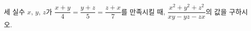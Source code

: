 세 실수 $x$, $y$, $z$가 $\dfrac{x+y}{4}=\dfrac{y+z}{5}=\dfrac{z+x}{7}$를 만족시킬 때, $\dfrac{x^2+y^2+z^2}{xy-yz-zx}$의 값을 구하시오. 
